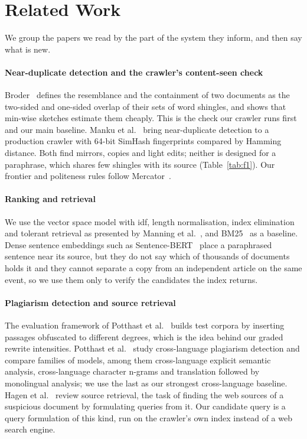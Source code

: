 \documentclass[11pt,a4paper]{article}
\begin{document}
\section{Related Work}
\label{sec:related}

We group the papers we read by the part of the system they inform, and then say what is new.

\paragraph{Near-duplicate detection and the crawler's content-seen check} Broder~\cite{broder1997} defines the resemblance and the containment of two documents as the two-sided and one-sided overlap of their sets of word shingles, and shows that min-wise sketches estimate them cheaply. This is the check our crawler runs first and our main baseline. Manku et al.~\cite{manku2007} bring near-duplicate detection to a production crawler with 64-bit SimHash fingerprints compared by Hamming distance. Both find mirrors, copies and light edits; neither is designed for a paraphrase, which shares few shingles with its source (Table~\ref{tab:f1}). Our frontier and politeness rules follow Mercator~\cite{heydon1999}.

\paragraph{Ranking and retrieval} We use the vector space model with idf, length normalisation, index elimination and tolerant retrieval as presented by Manning et al.~\cite{iir2008}, and BM25~\cite{robertson2009} as a baseline. Dense sentence embeddings such as Sentence-BERT~\cite{reimers2019} place a paraphrased sentence near its source, but they do not say which of thousands of documents holds it and they cannot separate a copy from an independent article on the same event, so we use them only to verify the candidates the index returns.

\paragraph{Plagiarism detection and source retrieval} The evaluation framework of Potthast et al.~\cite{potthast2010} builds test corpora by inserting passages obfuscated to different degrees, which is the idea behind our graded rewrite intensities. Potthast et al.~\cite{potthast2011} study cross-language plagiarism detection and compare families of models, among them cross-language explicit semantic analysis, cross-language character n-grams and translation followed by monolingual analysis; we use the last as our strongest cross-language baseline. Hagen et al.~\cite{hagen2015} review source retrieval, the task of finding the web sources of a suspicious document by formulating queries from it. Our candidate query is a query formulation of this kind, run on the crawler's own index instead of a web search engine.
\end{document}
